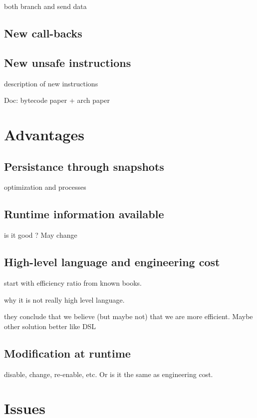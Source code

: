 \documentclass[a4paper,12pt,twoside]{../includes/ThesisStyle}
\begin{document}
both branch and send data

\subsection{New call-backs}

\subsection{New unsafe instructions}

description of new instructions

Doc: bytecode paper + arch paper

\section{Advantages}

\subsection{Persistance through snapshots}

optimization and processes

\subsection{Runtime information available}

is it good ? May change

\subsection{High-level language and engineering cost}

start with efficiency ratio from known books.

why it is not really high level language.

they conclude that we believe (but maybe not) that we are more efficient. Maybe other solution better like DSL

\subsection{Modification at runtime}

disable, change, re-enable, etc.
Or is it the same as engineering cost.

\section{Issues}
\end{document}
